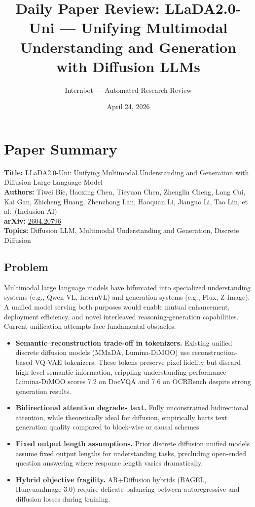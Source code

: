 \documentclass[11pt]{article}
\title{Daily Paper Review: LLaDA2.0-Uni --- Unifying Multimodal\\Understanding and Generation with Diffusion LLMs}
\author{Internbot --- Automated Research Review}
\date{April 24, 2026}
\begin{document}
\maketitle

\section{Paper Summary}

\textbf{Title:} LLaDA2.0-Uni: Unifying Multimodal Understanding and Generation with Diffusion Large Language Model \\
\textbf{Authors:} Tiwei Bie, Haoxing Chen, Tieyuan Chen, Zhenglin Cheng, Long Cui, Kai Gan, Zhicheng Huang, Zhenzhong Lan, Haoquan Li, Jianguo Li, Tao Lin, et al.\ (Inclusion AI) \\
\textbf{arXiv:} \href{https://arxiv.org/abs/2604.20796}{2604.20796} \\
\textbf{Topics:} Diffusion LLM, Multimodal Understanding and Generation, Discrete Diffusion

\subsection{Problem}

Multimodal large language models have bifurcated into specialized understanding systems (e.g., Qwen-VL, InternVL) and generation systems (e.g., Flux, Z-Image). A unified model serving both purposes would enable mutual enhancement, deployment efficiency, and novel interleaved reasoning-generation capabilities. Current unification attempts face fundamental obstacles:

\begin{itemize}
    \item \textbf{Semantic--reconstruction trade-off in tokenizers.} Existing unified discrete diffusion models (MMaDA, Lumina-DiMOO) use reconstruction-based VQ-VAE tokenizers. These tokens preserve pixel fidelity but discard high-level semantic information, crippling understanding performance---Lumina-DiMOO scores 7.2 on DocVQA and 7.6 on OCRBench despite strong generation results.
    \item \textbf{Bidirectional attention degrades text.} Fully unconstrained bidirectional attention, while theoretically ideal for diffusion, empirically hurts text generation quality compared to block-wise or causal schemes.
    \item \textbf{Fixed output length assumptions.} Prior discrete diffusion unified models assume fixed output lengths for understanding tasks, precluding open-ended question answering where response length varies dramatically.
    \item \textbf{Hybrid objective fragility.} AR+Diffusion hybrids (BAGEL, HunyuanImage-3.0) require delicate balancing between autoregressive and diffusion losses during training.
\end{itemize}
\end{document}
